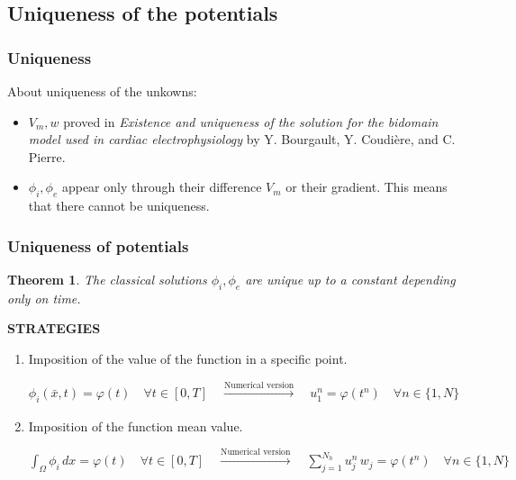 \documentclass[8pt]{beamer}
\newtheorem*{theor}{Theorem}
\begin{document}
\begin{frame}
\section{Uniqueness of the potentials}
\frametitle{Uniqueness}
About uniqueness of the unkowns:
\vspace{2mm}
\begin{itemize}
\item $V_m, w$ proved in \textit{Existence and uniqueness of the solution for the bidomain model used in cardiac electrophysiology} by Y. Bourgault, Y. Coudière, and C. Pierre.
\vspace{2mm}
\item $\phi_i, \phi_e$ appear only through their difference $V_m$ or their gradient. This means that there cannot be uniqueness.
\end{itemize}
\end{frame}
\begin{frame}
\frametitle{Uniqueness of potentials}
\begin{theor}
The classical solutions $\phi_i,\phi_e$ are unique up to a constant depending only on time.
\end{theor}
\begin{center}
	\textbf{STRATEGIES}
\end{center}
\begin{enumerate}
\item Imposition of the value of the function in a specific point. \\
\begin{small}
	$\phi_i(\bar{x},t) = \varphi(t) \quad \forall t \in [0,T] \quad
	\xrightarrow[]{\text{Numerical version}}\quad
	u_1^n = \varphi(t^n) \quad \forall n \in \{1,N\}$ \vspace{4mm}
\end{small}
\item Imposition of the function mean value. \\
\begin{small}
$\displaystyle \int_\Omega \phi_i\,dx = \varphi(t) \quad \forall t \in [0,T] \quad
\xrightarrow[]{\text{Numerical version}}\quad \sum_{j=1}^{N_h} u_j^n \, w_j = \varphi(t^n)\quad \forall n \in \{1,N\}$
\end{small}
\end{enumerate}
\end{frame}
\end{document}
